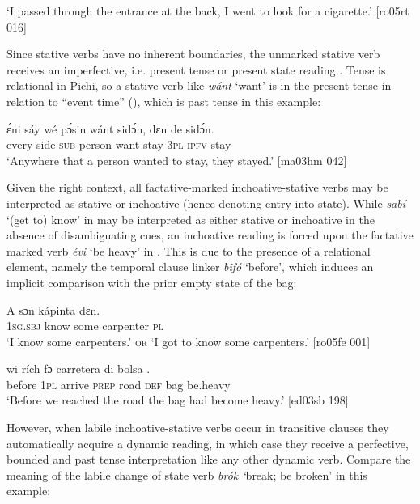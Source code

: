 \glt ‘I passed through the entrance at the back, I went to look for a cigarette.’ [ro05rt 016]
\z

Since stative verbs have no inherent boundaries, the unmarked stative verb receives an imperfective, i.e. present tense or present state reading . Tense is relational in Pichi, so a stative verb like \textit{wánt} ‘want’ is in the present tense in relation to “event time” (\citealt{ChungTimberlake1985}), which is past tense in this example:


\ea%
    \label{ex:key:315}
    \gll ɛ́ni    sáy  wé  pɔ́sin  wánt  sidɔ́n,  dɛn  de  sidɔ́n.\\
every  side  \textsc{sub}  person  want  stay    \textsc{3pl}  \textsc{ipfv}  stay\\

\glt ‘Anywhere that a person wanted to stay, they stayed.’ [ma03hm 042]
\z

Given the right context, all factative-marked inchoative-stative verbs may be interpreted as stative or inchoative (hence denoting entry-into-state). While \textit{sabí} ‘(get to) know’ in  may be interpreted as either stative or inchoative in the absence of disambiguating cues, an inchoative reading is forced upon the factative marked verb \textit{évi} ‘be heavy’ in . This is due to the presence of a relational element, namely the temporal clause linker \textit{bifó} ‘before’, which induces an implicit comparison with the prior empty state of the bag:


\ea%
    \label{ex:key:316}
    \gll \MakeUppercase{A}       sɔn    kápinta    dɛn.\\
\textsc{1sg.sbj}  know  some  carpenter  \textsc{pl}\\

\glt ‘I know some carpenters.’ \textsc{or} ‘I got to know some carpenters.’ [ro05fe 001]
\z


\ea%
    \label{ex:key:317}
    \gll {}    wi  rích    fɔ  carretera  di  bolsa  .\\
before  \textsc{1pl}  arrive  \textsc{prep}  road      \textsc{def}  bag    be.heavy\\

\glt ‘Before we reached the road the bag had become heavy.’ [ed03sb 198]
\z

However, when labile inchoative-stative verbs occur in transitive clauses they automatically acquire a dynamic reading, in which case they receive a perfective, bounded and past tense interpretation like any other dynamic verb. Compare the meaning of the labile change of state verb \textit{brók ‘}break; be broken’ in this example: 


